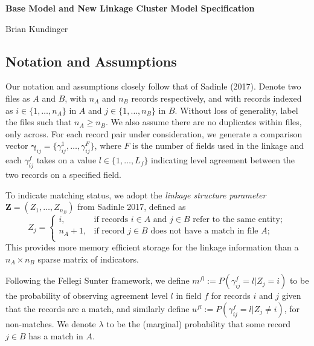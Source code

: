 \documentclass[
  12pt,
]{article}
\author{}
\date{\vspace{-2.5em}}
\begin{document}
\begin{flushright} 
    \end{flushright}
    \begin{center} \textbf{Base Model and New Linkage Cluster Model Specification}
    
    Brian Kundinger

    \end{center}

\hypertarget{notation-and-assumptions}{%
\subsection{Notation and Assumptions}\label{notation-and-assumptions}}

Our notation and assumptions closely follow that of Sadinle (2017).
Denote two files as \(A\) and \(B\), with \(n_A\) and \(n_B\) records
respectively, and with records indexed as \(i \in \{1, \ldots, n_A\}\)
in \(A\) and \(j \in \{1, \ldots, n_B\}\) in \(B\). Without loss of
generality, label the files such that \(n_A \geq n_B\). We also assume
there are no duplicates within files, only across. For each record pair
under consideration, we generate a comparison vector
\(\boldsymbol{\gamma}_{ij} = \{\gamma_{ij}^1, \ldots, \gamma_{ij}^F\}\),
where \(F\) is the number of fields used in the linkage and each
\(\gamma_{ij}^f\) takes on a value \(l \in \{1, \ldots, L_f\}\)
indicating level agreement between the two records on a specified field.

To indicate matching status, we adopt the \emph{linkage structure
parameter} \(\mathbf{Z} = (Z_1, \ldots, Z_{n_B})\) from Sadinle 2017,
defined as \[Z_j=\begin{cases} 
    i,  & \text{if records } i\in A \text{ and } j\in B \text{ refer to the same entity}; \\
    n_A + 1,  & \text{if record } j\in B \text{ does not have a match in file } A; \\
\end{cases}\] This provides more memory efficient storage for the
linkage information than a \(n_A \times n_B\) sparse matrix of
indicators.

Following the Fellegi Sunter framework, we define
\(m^{fl}:= P(\gamma_{ij}^f = l |Z_j = i)\) to be the probability of
observing agreement level \(l\) in field \(f\) for records \(i\) and
\(j\) given that the records are a match, and similarly define
\(u^{fl}:= P(\gamma_{ij}^f = l |Z_j \neq i)\), for non-matches. We
denote \(\lambda\) to be the (marginal) probability that some record
\(j \in B\) has a match in \(A\).
\end{document}
